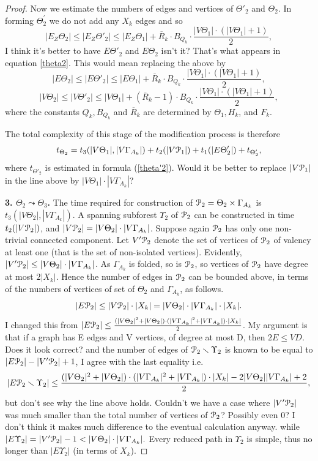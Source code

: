 \documentclass[a4paper,12pt]{article}
\newcommand{\G}{\Gamma }
\newcommand{\T}{\Theta }
\newcommand{\U}{\Upsilon }
\newcommand{\cP}{{\cal{P}}}
\numberwithin{equation}{section}
\numberwithin{figure}{section}
\begin{document}
\begin{proof}
Now we estimate the numbers of  edges  and
vertices  of $\T'_2$ and $\T_2$.
In forming $\T_2^\prime$  we do not add any $X_k$
edges and so 
\begin{equation}\label{eztheta2}
|E_Z\T_2| \le |E_Z\T'_2| \le |E_Z\T_1|+\overline{R}_k\cdot B_{Q_k}
\cdot \frac{|V\T_1|\cdot(|V\T_1|+1)}{2},
\end{equation}
{\ajd I think it's better to have $E \T'_2$ and $E \T_2$ isn't it?
That's what appears in equation \ref{theta2}. This would mean
replacing the above by  
\[
|E\T_2| \le |E\T'_2| \le |E\T_1|+\overline{R}_k\cdot B_{Q_k}
\cdot \frac{|V\T_1|\cdot(|V\T_1|+1)}{2},
\]
}
\begin{equation}\label{vtheta2}
|V\T_2| \le |V \T'_2| \le |V\T_1|+(\overline{R}_k-1)\cdot B_{Q_k}
\cdot \frac{|V\T_1|\cdot(|V\T_1|+1)}{2},
\end{equation}
where the constants $Q_k, B_{Q_k}$ and  $\overline{R}_k$ are determined  by $\T_1,
H_k$, and $F_k$.


The total complexity of this stage of the modification process is
therefore 
\begin{equation}\label{theta2}
t_{\T_2} = t_3(|V \T_1|, |V \G_{A_k}|) + t_2(|V\cP_1|)+
t_1(|E\T'_2|) + t_{\T'_2},
\end{equation}
where $t_{\T'_2}$ is estimated in formula (\ref{theta'2}).
{\ajd Would it be better to replace $|V\cP_1|$ in the line above by 
$|V\T_1|\cdot|V\G_{A_k}|$?}

{\bf 3. $\T_2 \leadsto \T_3$.} The time required for  construction of 
$\cP_2=\T_2\times \G_{A_k}$ is  $t_3(|V \T_2|,
|V \G_{A_k}|)$. A spanning subforest $\U_2$ of $\cP_2$ can be
constructed in time $t_2(|V\cP_2|)$, and 
$|V\cP_2|=|V\T_2|\cdot |V \G_{A_k}|$. Suppose again $\cP_2$ has
only one non-trivial connected component.
 Let $V'\cP_2$ denote the set of vertices of $\cP_2$ of valency at least one
(that is the set of non-isolated vertices). 
Evidently, $|V'\cP_2| \le |V\T_2|\cdot |V \G_{A_k}|$.
As $\G_{A_k}$ is folded, so is $\cP_2$, so vertices of $\cP_2$ have
degree at most $2|X_k|$. Hence  
the number of edges in $\cP_2$ can be bounded above, in terms
of the numbers of vertices of set of $\T_2$ and $\G_{A_k}$, as follows.
\[ |E\cP_2| \le |V\cP_2|\cdot |X_k|=|V\T_2|\cdot |V \G_{A_k}|\cdot |X_k|.\]
{\ajd I changed this from 
$|E\cP_2| \le \frac{(|V\T_2|^2+|V\T_2|)\cdot
(|V\G_{A_k}|^2+|V\G_{A_k}|) \cdot |X_k|}{2}$. My argument is that if a graph
has E edges and V vertices, of degree at most D, then $2E\le VD$. Does it look 
correct? } 
and the number of edges of $\cP_2 \smallsetminus \U_2$ is known to
be equal to $|E\cP_2| - |V'\cP_2|+1$, {\ajd I agree with the last equality} i.e.
\[|E\cP_2\smallsetminus \U_2| \le \frac{(|V\T_2|^2+|V\T_2|)\cdot
(|V\G_{A_k}|^2+|V\G_{A_k}|) \cdot |X_k| -2|V\T_2||V\G_{A_k}|+2
}{2},\]
{\ajd but don't see why the line above holds. Couldn't we have a case 
where $|V'\cP_2|$ was much smaller than the total number of vertices of 
$\cP_2$? Possibly even 0? I don't think it makes much difference to 
the eventual calculation anyway.} 
while $|E \U_2| = |V'\cP_2| - 1 < |V\T_2|\cdot |V \G_{A_k}|.$ 
Every reduced path in $\U_2$ is simple, thus no longer than
$|E\U_2|$ (in terms of $X_k$). 


\end{proof}
\end{document}
